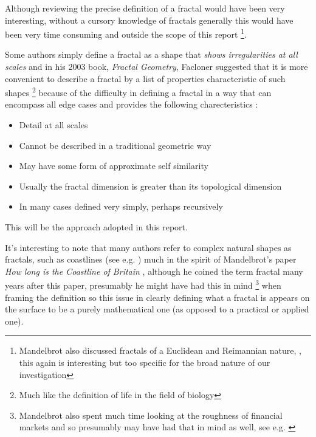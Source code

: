 \documentclass[a4paper,11pt,twoside]{article}
\begin{document}
Although reviewing the precise definition of a fractal would have been very
interesting, without a cursory knowledge of fractals generally this would have
been very time consuming and outside the scope of this report \footnote{Mandelbrot
also discussed fractals of a Euclidean and Reimannian nature,
\cite[p. 361]{mandelbrotFractalGeometryNature1982}, this again is interesting
but too specific for the broad nature of our investigation}.

Some authors simply define a fractal as a shape that \emph{shows irregularities at
all scales} \cite[p. 1]{gouyetPhysicsFractalStructures1996} and in his 2003
book, \emph{Fractal Geometry}, Facloner suggested that it is more convenient to
describe a fractal by a list of properties characteristic of such shapes \footnote{Much like the definition of life in the field of biology} because of the
difficulty in defining a fractal in a way that can encompass all edge cases and
provides the following charecteristics
\cite[p. xxv]{falconerFractalGeometryMathematical2003b}:

\begin{itemize}
\item Detail at all scales
\item Cannot be described in a traditional geometric way
\item May have some form of approximate self similarity
\item Usually the fractal dimension is greater than its topological dimension
\item In many cases defined very simply, perhaps recursively
\end{itemize}

This will be the approach adopted in this report.

It's interesting to note that many authors refer to complex natural shapes as
fractals, such as coastlines (see e.g.
\cite{jiangFractalAnalysisComplexity1998,zhuFractalMechanismCoastline2002,zhongFractalPropertiesShoreline2017})
much in the spirit of Mandelbrot's paper \emph{How long is the Coastline of Britain}
\cite{mandelbrotHowLongCoast1967}, although he coined the term fractal many years
after this paper, presumably he might have had this in mind \footnote{Mandelbrot also
spent much time looking at the roughness of financial markets and so presumably
may have had that in mind as well, see e.g.
\cite{gomoryBenoitMandelbrot19242010,mandelbrotMisBehaviourMarkets2008}} when
framing the definition so this issue in clearly defining what a fractal is
appears on the surface to be a purely mathematical one (as opposed to a
practical or applied one).
\end{document}

